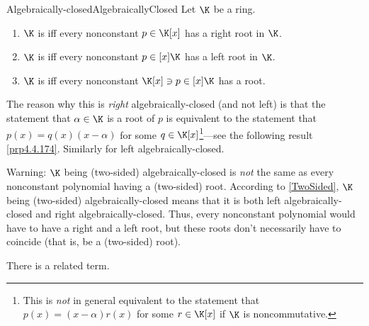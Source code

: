 \begin{dfn}{Algebraically-closed}{AlgebraicallyClosed}
	Let $\K$ be a ring.
	\begin{enumerate}
		\item $\K$ is  iff every nonconstant $p\in \K [x]$ has a right root in $\K$.
		\item $\K$ is  iff every nonconstant $p\in [x]\K$ has a left root in $\K$.
		\item $\K$ is  iff every nonconstant $\K [x]\ni p\in [x]\K$ has a root.
	\end{enumerate}
	\begin{rmk}
		The reason why this is \emph{right} algebraically-closed (and not left) is that the statement that $\alpha \in \K$ is a root of $p$ is equivalent to the statement that $p(x)=q(x)(x-\alpha )$ for some $q\in \K [x]$\footnote{This is \emph{not} in general equivalent to the statement that $p(x)=(x-\alpha )r(x)$ for some $r\in \K [x]$ if $\K$ is noncommutative.}---see the following result \cref{prp4.4.174}.  Similarly for left algebraically-closed.
	\end{rmk}
	\begin{rmk}
		Warning:  $\K$ being (two-sided) algebraically-closed is \emph{not} the same as every nonconstant polynomial having a (two-sided) root.  According to \cref{TwoSided}, $\K$ being (two-sided) algebraically-closed means that it is both left algebraically-closed and right algebraically-closed.  Thus, every nonconstant polynomial would have to have a right and a left root, but these roots don't necessarily have to coincide (that is, be a (two-sided) root).
	\end{rmk}
\end{dfn}
There is a related term.
